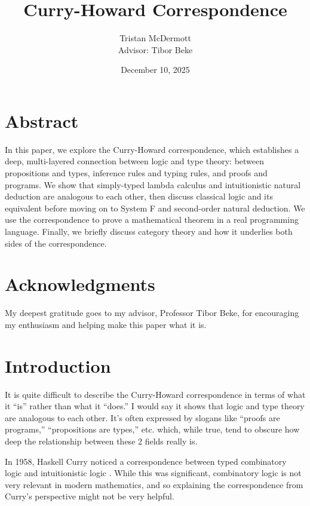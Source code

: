 \documentclass[12pt]{article}
\title{Curry-Howard Correspondence}
\author{Tristan McDermott \\ Advisor: Tibor Beke}
\date{December 10, 2025}
\begin{document}
\maketitle

\pagebreak

\section{Abstract}

In this paper, we explore the Curry-Howard correspondence, which establishes a deep, multi-layered connection between logic and type theory: between propositions and types, inference rules and typing rules, and proofs and programs. We show that simply-typed lambda calculus and intuitionistic natural deduction are analogous to each other, then discuss classical logic and its equivalent before moving on to System F and second-order natural deduction. We use the correspondence to prove a mathematical theorem in a real programming language. Finally, we briefly discuss category theory and how it underlies both sides of the correspondence.

\section{Acknowledgments}

My deepest gratitude goes to my advisor, Professor Tibor Beke, for encouraging my enthusiasm and helping make this paper what it is.

\tableofcontents

\section{Introduction}

It is quite difficult to describe the Curry-Howard correspondence in terms of what it ``is'' rather than what it ``does.'' I would say it shows that logic and type theory are analogous to each other. It's often expressed by slogans like ``proofs are programs,'' ``propositions are types,'' etc. which, while true, tend to obscure how deep the relationship between these 2 fields really is.

In 1958, Haskell Curry noticed a correspondence between typed combinatory logic and intuitionistic logic \cite{curry}. While this was significant, combinatory logic is not very relevant in modern mathematics, and so explaining the correspondence from Curry's perspective might not be very helpful.
\end{document}
